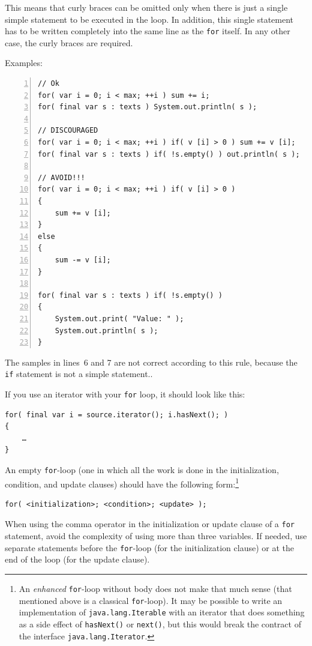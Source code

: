 \documentclass[11pt,a4paper, titlepage, parskip=half, headsepline, footsepline, cleardoublepage=current, headheight=1cm]{scrbook}
\begin{document}
This means that curly braces can be omitted only when there is just a single simple statement to be executed in the loop. In addition, this single statement has to be written completely into the same line as the \lstinline|for| itself. In any other case, the curly braces are required.

Examples:
\begin{lstlisting}[numbers=left]
// Ok
for( var i = 0; i < max; ++i ) sum += i;
for( final var s : texts ) System.out.println( s );

// DISCOURAGED
for( var i = 0; i < max; ++i ) if( v [i] > 0 ) sum += v [i];
for( final var s : texts ) if( !s.empty() ) out.println( s );

// AVOID!!!
for( var i = 0; i < max; ++i ) if( v [i] > 0 )
{
    sum += v [i];
}
else
{
    sum -= v [i];
}

for( final var s : texts ) if( !s.empty() )
{
    System.out.print( "Value: " );
    System.out.println( s );
}
\end{lstlisting}
The samples in lines~6 and 7 are not correct according to this rule, because the \lstinline|if| statement is not a simple statement..

If you use an iterator with your \lstinline|for| loop, it should look like this:
\begin{lstlisting}
for( final var i = source.iterator(); i.hasNext(); )
{
    …
}
\end{lstlisting}

An empty \lstinline|for|-loop (one in which all the work is done in the initialization, condition, and update clauses) should have the following form:\footnote{An \textit{enhanced} \lstinline|for|-loop without body does not make that much sense (that mentioned above is a classical \lstinline|for|-loop). It may be possible to write an implementation of \lstinline|java.lang.Iterable| with an iterator that does something as a side effect of \lstinline|hasNext()| or \lstinline|next()|, but this would break the contract of the interface \lstinline|java.lang.Iterator|.}
\begin{lstlisting}
for( <initialization>; <condition>; <update> );
\end{lstlisting}

When using the comma operator in the initialization or update clause of a \lstinline|for| statement, avoid the complexity of using more than three variables. If needed, use separate statements before the \lstinline|for|-loop (for the initialization clause) or at the end of the loop (for the update clause).
\end{document}
